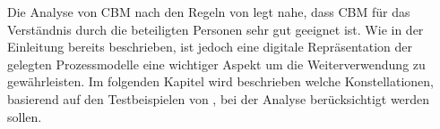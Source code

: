 Die Analyse von CBM nach den Regeln von \citet{MENDLING2010127} legt nahe, dass CBM für das Verständnis durch die beteiligten Personen sehr gut geeignet ist. Wie in der Einleitung bereits beschrieben, ist jedoch eine digitale Repräsentation der gelegten Prozessmodelle eine wichtiger Aspekt um die Weiterverwendung zu gewährleisten. Im folgenden Kapitel wird beschrieben welche Konstellationen, basierend auf den Testbeispielen von \citet{max}, bei der Analyse berücksichtigt werden sollen.


